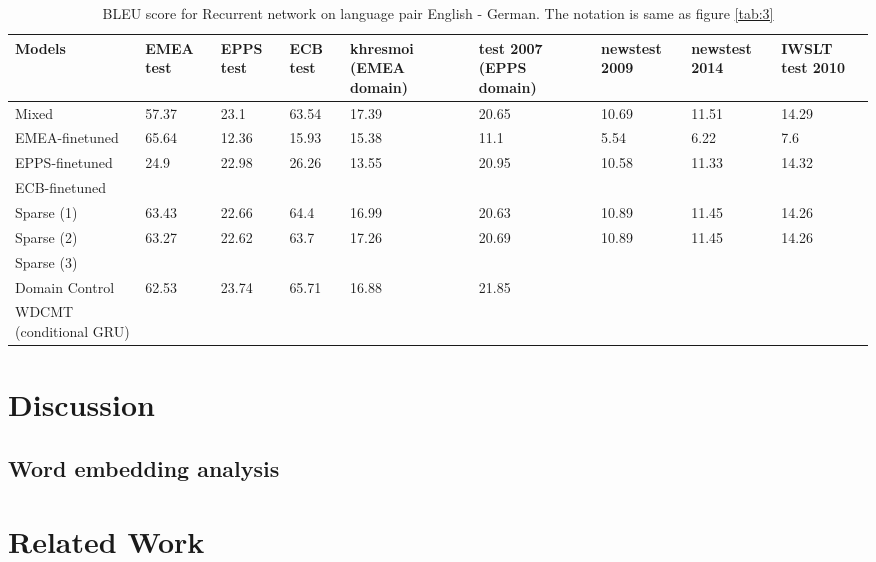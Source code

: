 \documentclass[11pt,a4paper]{article}
\newcommand{\fyTodo}[1]{\Todo[FY:]{\textcolor{orange}{#1}}}
\newcommand{\fyDone}[1]{\done[FY]\Todo[FY:]{\textcolor{orange}{#1}}}
\begin{document}
\begin{table}
\begin{center}
 \begin{tabularx}{\textwidth}{|| X | X | X | X | X | X | X | X | X ||} 
 \hline
 Models & EMEA test & EPPS test & ECB test & khresmoi (EMEA domain) & test 2007 (EPPS domain) & newstest 2009 & newstest 2014 & IWSLT test 2010 \\ [0.5ex] 
 \hline\hline
 Mixed & 57.37 & 23.1 & 63.54 & 17.39 & 20.65 & 10.69 & 11.51 & 14.29 \\
 \hline
 EMEA-finetuned & 65.64 & 12.36 & 15.93 & 15.38 & 11.1 & 5.54 & 6.22 & 7.6 \\
 \hline
 EPPS-finetuned & 24.9 & 22.98 & 26.26 & 13.55 & 20.95 & 10.58 & 11.33 & 14.32 \\
 \hline
 ECB-finetuned & & & & & & & & \\
 \hline
 Sparse (1) & 63.43 & 22.66 & 64.4 & 16.99 & 20.63 & 10.89 & 11.45 & 14.26 \\
 \hline
 Sparse (2) & 63.27 & 22.62 & 63.7 & 17.26 & 20.69 & 10.89 & 11.45 & 14.26 \\
 \hline
 Sparse (3) &  &  &  &  &  &  &  & \\
 \hline
 Domain Control & 62.53 & 23.74 & 65.71 & 16.88 & 21.85 & & & \\
 \hline
 WDCMT (conditional GRU) & & & & & & & & \\
 \hline 
\end{tabularx}
\end{center}
\caption{BLEU score for Recurrent network on language pair English - German. The notation is same as figure \ref{tab:3}}
\label{tab:4}
\end{table}

\section{Discussion}
\subsection{Word embedding analysis}

\section{Related Work \label{sec:related_work}}
\fyDone{Add standard labels to sections}
\fyDone{Related work goes last}
\fyTodo{Compare also to Peng 2017}
\end{document}
